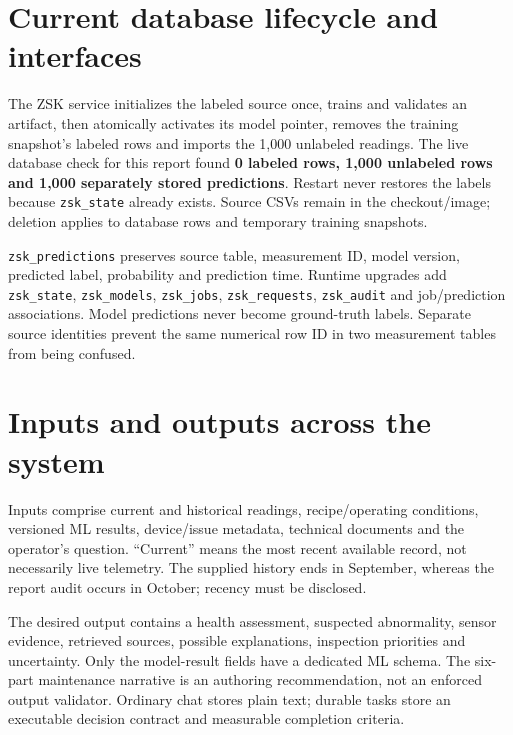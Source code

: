 \section{Current database lifecycle and interfaces}
The ZSK service initializes the labeled source once, trains and validates an artifact, then atomically activates its model pointer, removes the training snapshot's labeled rows and imports the 1,000 unlabeled readings. The live database check for this report found \textbf{0 labeled rows, 1,000 unlabeled rows and 1,000 separately stored predictions}. Restart never restores the labels because \texttt{zsk\_state} already exists. Source CSVs remain in the checkout/image; deletion applies to database rows and temporary training snapshots.

\texttt{zsk\_predictions} preserves source table, measurement ID, model version, predicted label, probability and prediction time. Runtime upgrades add \texttt{zsk\_state}, \texttt{zsk\_models}, \texttt{zsk\_jobs}, \texttt{zsk\_requests}, \texttt{zsk\_audit} and job/prediction associations. Model predictions never become ground-truth labels. Separate source identities prevent the same numerical row ID in two measurement tables from being confused.
\section{Inputs and outputs across the system}
Inputs comprise current and historical readings, recipe/operating conditions, versioned ML results, device/issue metadata, technical documents and the operator's question. ``Current'' means the most recent available record, not necessarily live telemetry. The supplied history ends in September, whereas the report audit occurs in October; recency must be disclosed.

The desired output contains a health assessment, suspected abnormality, sensor evidence, retrieved sources, possible explanations, inspection priorities and uncertainty. Only the model-result fields have a dedicated ML schema. The six-part maintenance narrative is an authoring recommendation, not an enforced output validator. Ordinary chat stores plain text; durable tasks store an executable decision contract and measurable completion criteria.
